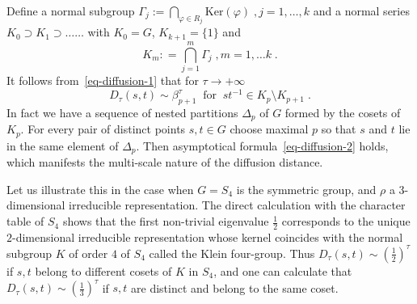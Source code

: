 Define a normal subgroup $\Gamma_j := \bigcap_{\varphi \in R_j} \text{Ker} (\varphi)\;, j= 1,\dots, k$ and a normal series $K_0 \supset K_1 \supset \dots\dots$ with $K_0 = G$, $K_{k+1} =\{1\}$ and
\[
K_m : = \bigcap_{j=1}^m \Gamma_j\;, m=1,\dots k\;.
\]
It follows from~\eqref{eq-diffusion-1} that for $\tau \to +\infty$
\begin{equation}\label{eq-diffusion-2}
D_\tau(s,t) \sim \beta_{p+1}^\tau \;\;\text{for}\;\; st^{-1} \in K_p \setminus K_{p+1}\;.
\end{equation}
In fact we have a sequence of nested partitions $\Delta_p$ of $G$ formed by the cosets of $K_p$. For every pair of distinct points $s,t \in G$ choose maximal $p$ so that $s$ and $t$ lie in the same element of $\Delta_p$. Then asymptotical formula~\eqref{eq-diffusion-2} holds, which manifests the multi-scale nature of the diffusion distance.

Let us illustrate this in the case when $G=S_4$ is the symmetric group, and $\rho$ a $3$-dimensional irreducible representation. The direct calculation with the character table of $S_4$ shows that the first non-trivial eigenvalue $\frac{1}{2}$ corresponds to the unique $2$-dimensional irreducible representation whose kernel coincides with the normal subgroup $K$ of order $4$ of $S_4$ called the Klein four-group. Thus $D_\tau(s,t) \sim (\frac{1}{2})^\tau$ if $s,t$ belong to different cosets of $K$ in $S_4$, and one can calculate that $D_\tau(s,t) \sim (\frac{1}{3})^\tau$ if $s,t$ are distinct and belong to the same coset.

